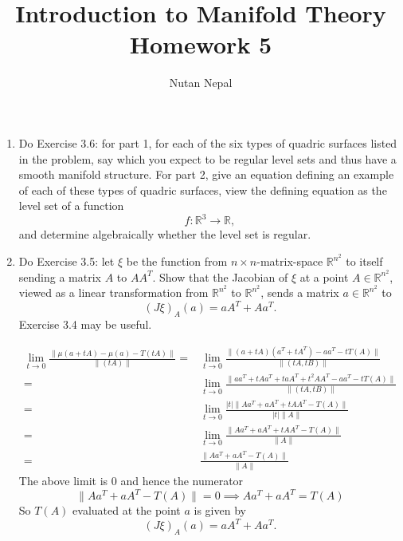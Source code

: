 \documentclass[12pt]{article}
\title{Introduction to Manifold Theory \\
\large Homework 5
}
\author{Nutan Nepal}
\newcommand{\rl}{\mathbb{R}}
\begin{document}
\maketitle
\makebox[\linewidth]{\rule{200mm}{1pt}}
\vspace{1mm}

\begin{enumerate}

\item Do Exercise 3.6: for part 1, for each of
    the six types of quadric surfaces listed in
    the problem, say which you expect to be
    regular level sets and thus have a smooth
    manifold structure. For part 2, give an
    equation defining an example of each of these
    types of quadric surfaces, view the defining
    equation as the level set of a function 
    \[f \colon \rl^3 \to \rl,\]
    and determine algebraically whether the
    level set is regular.

\begin{mybox}

\end{mybox}


\item Do Exercise 3.5: let $\xi$ be the function
    from $n \times n$-matrix-space $\rl^{n^2}$ to
    itself sending a matrix $A$ to $AA^T$. Show that
    the Jacobian of $\xi$ at a point
    $A \in \rl^{n^2}$, viewed as a linear
    transformation from $\rl^{n^2}$ to $\rl^{n^2}$,
    sends a matrix $a \in \rl^{n^2}$ to
    \[(J\xi)_A(a) = a A^T + A a^T.\]
Exercise 3.4 may be useful.
 
\begin{mybox}


    \begin{align*}
        \lim_{t\to 0}
        {\frac{\|\mu(a+tA)-\mu(a)-T(tA)\|}
        {\|(tA)\|}}
        =&\lim_{t\to 0}
        {\frac{\|(a+tA)(a^T+tA^T)-aa^T
        -tT(A)\|}
        {\|(tA,tB)\|}}\\
        =&\lim_{t\to 0}
        {\frac{\|aa^T+tAa^T+taA^T+t^2AA^T-aa^T
        -tT(A)\|}
        {\|(tA,tB)\|}}\\
        =&\lim_{t\to 0}
        {\frac{|t|\|Aa^T+aA^T+tAA^T-T(A)\|}
        {|t|\|A\|}}\\
        =&\lim_{t\to 0}
        {\frac{\|Aa^T+aA^T+tAA^T-T(A)\|}
        {\|A\|}}\\
        =&\frac{\|Aa^T+aA^T-T(A)\|}
        {\|A\|}
    \end{align*}
    The above limit is 0 and hence the numerator
    \[\|Aa^T+aA^T-T(A)\|=0\implies
    Aa^T+aA^T=T(A)\]
    So $T(A)$ evaluated at the point $a$ is
    given by
    \[(J\xi)_A(a) = a A^T + A a^T.\]
\end{mybox}

\end{enumerate}
\end{document}
